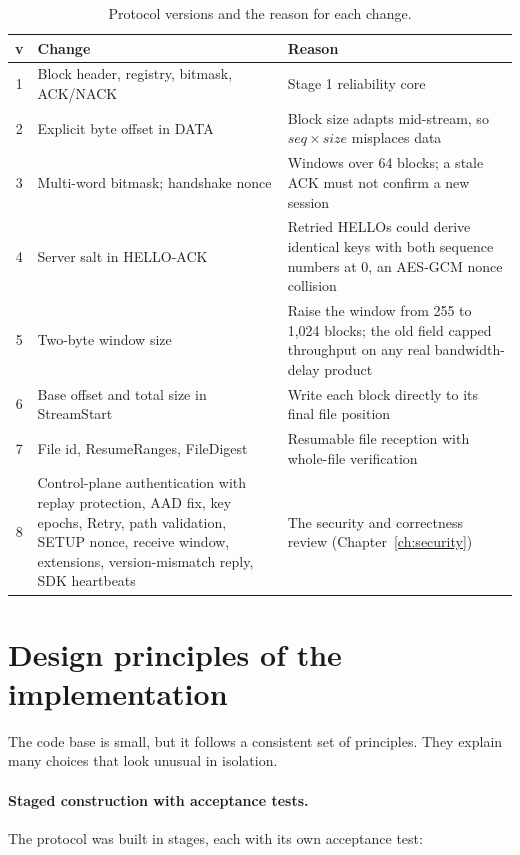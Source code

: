 \begin{table}[H]
\centering\small
\caption{Protocol versions and the reason for each change.}\label{tab:versions}
\begin{tabularx}{\linewidth}{c>{\raggedright\arraybackslash}p{5cm}X}
\toprule
\textbf{v} & \textbf{Change} & \textbf{Reason} \\
\midrule
1 & Block header, registry, bitmask, ACK/NACK & Stage 1 reliability core \\
2 & Explicit byte offset in DATA & Block size adapts mid-stream, so $\mathit{seq}\times\mathit{size}$ misplaces data \\
3 & Multi-word bitmask; handshake nonce & Windows over 64 blocks; a stale ACK must not confirm a new session \\
4 & Server salt in HELLO-ACK & Retried HELLOs could derive identical keys with both sequence numbers at 0, an AES-GCM nonce collision \\
5 & Two-byte window size & Raise the window from 255 to 1,024 blocks; the old field capped throughput on any real bandwidth-delay product \\
6 & Base offset and total size in StreamStart & Write each block directly to its final file position \\
7 & File id, ResumeRanges, FileDigest & Resumable file reception with whole-file verification \\
8 & Control-plane authentication with replay protection, AAD fix, key epochs, Retry, path validation, SETUP nonce, receive window, extensions, version-mismatch reply, SDK heartbeats & The security and correctness review (Chapter~\ref{ch:security}) \\
\bottomrule
\end{tabularx}
\end{table}

\section{Design principles of the implementation}\label{sec:principles}

The code base is small, but it follows a consistent set of principles. They explain many choices that look
unusual in isolation.

\paragraph{Staged construction with acceptance tests.} The protocol was built in stages, each with its own
acceptance test:

